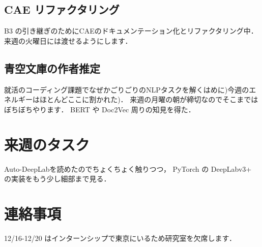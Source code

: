 \documentclass[onecolumn]{ujarticle}   %
\begin{document}
	\subsection{CAE リファクタリング}
	B3 の引き継ぎのためにCAEのドキュメンテーション化とリファクタリング中．
	来週の火曜日には渡せるようにします．

	\subsection{青空文庫の作者推定}
	就活のコーディング課題でなぜかごりごりのNLPタスクを解くはめに)今週のエネルギーはほとんどここに割かれた)．
	来週の月曜の朝が締切なのでそこまではぼちぼちやります．
	BERT や Doc2Vec 周りの知見を得た．

	\section{来週のタスク}
	Auto-DeepLabを読めたのでちょくちょく触りつつ，
	PyTorch の DeepLabv3+ の実装をもう少し細部まで見る．

	\section{連絡事項}
	12/16-12/20 はインターンシップで東京にいるため研究室を欠席します．
\end{document}
